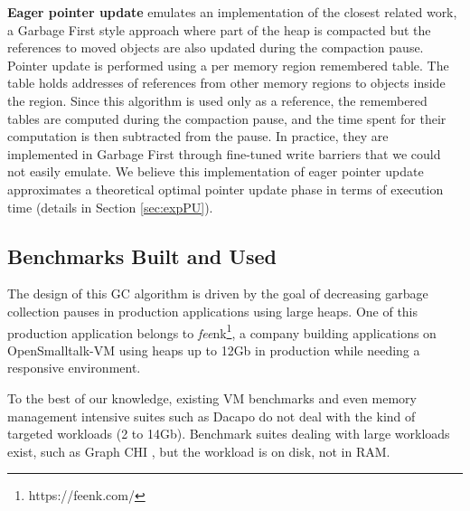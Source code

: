\documentclass[sigplan,10pt,screen]{acmart}\settopmatter{printfolios=true,printccs=true,printacmref=true}
\def\feenk{\textit{fee}\textsf{nk}\xspace}
\def\OpenSmalltalkVM{OpenSmalltalk-VM\xspace}
\def\ie{\emph{i.e., }}
\begin{document}
\textbf{Eager pointer update} emulates an implementation of the closest related work, a Garbage First style approach where part of the heap is compacted but the references to moved objects are also updated during the compaction pause. Pointer update is performed using a per memory region remembered table. The table holds addresses of references from other memory regions to objects inside the region. Since this algorithm is used only as a reference, the remembered tables are computed during the compaction pause, and the time spent for their computation is then subtracted from the pause. In practice, they are implemented in Garbage First through fine-tuned write barriers that we could not easily emulate. We believe this implementation of eager pointer update approximates a theoretical optimal pointer update phase in terms of execution time (details in Section \ref{sec:expPU}).%


\subsection{Benchmarks Built and Used}
The design of this GC algorithm is driven by the goal of decreasing garbage collection pauses in production applications using large heaps. One of this production application belongs to \feenk\footnote{https://feenk.com/}, a company building applications on \OpenSmalltalkVM using heaps up to 12Gb in production while needing a responsive environment. 

To the best of our knowledge, existing VM benchmarks and even memory management intensive suites such as Dacapo \cite{DacapoBench} do not deal with the kind of targeted workloads (2 to 14Gb). Benchmark suites dealing with large workloads exist, such as Graph CHI \cite{GraphCHI}, but the workload is on disk, not in RAM. 
\end{document}
